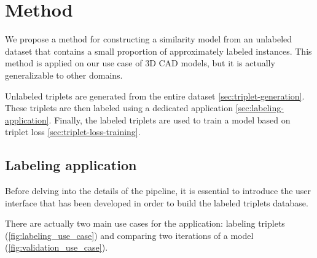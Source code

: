 \chapter{Method}
\label{sec:method}

We propose a method for constructing a similarity model from an unlabeled dataset that contains a small proportion of approximately labeled instances. This method is applied on our use case of 3D CAD models, but it is actually generalizable to other domains. 

Unlabeled triplets are generated from the entire dataset \autoref{sec:triplet-generation}. These triplets are then labeled using a dedicated application \autoref{sec:labeling-application}. Finally, the labeled triplets are used to train a model based on triplet loss \autoref{sec:triplet-loss-training}.


\section{Labeling application}
\label{sec:labeling-application}

Before delving into the details of the pipeline, it is essential to introduce the user interface that has been developed in order to build the labeled triplets database.

There are actually two main use cases for the application: labeling triplets (\autoref{fig:labeling_use_case}) and comparing two iterations of a model (\autoref{fig:validation_use_case}).

